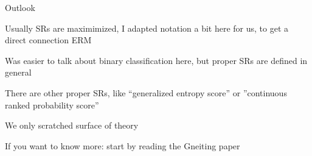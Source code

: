 \documentclass[11pt,compress,t,notes=noshow, xcolor=table]{beamer}
\begin{document}
\begin{framei}[sep=L]{Outlook}

    \item Usually SRs are maximimized, I adapted notation a bit here
    for us, to get a direct connection ERM

    \item Was easier to talk about binary classification here, 
    but proper SRs are defined in general

    \item There are other proper SRs, like ``generalized entropy score'' or ''continuous ranked probability score'' 

    \item We only scratched surface of theory

    \item  If you want to know more: start by reading the Gneiting paper
    
\end{framei}



\endlecture
\end{document}
